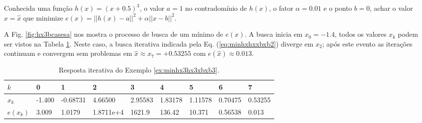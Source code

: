 \begin{example}\label{ex:minhx3hx3xbxb3}
Conhecida uma função $h(x)=(x+0.5)^3$, o valor $a=1$ no contradomínio de $h(x)$,
o fator $\alpha=0.01$ e o ponto $b=0$,
achar o valor $x=\hat{x}$ que minimize $e(x)=||h(x)-a||^2+\alpha||x-b||^2$.
\end{example}
\begin{SolutionT}\label{sol:minhx3hx3xbxb3}
 A Fig. \ref{fig:hx3bcasesa} nos mostra o processo de busca de um mínimo
 de $e(x)$. 
 A busca inicia em $x_0=-1.4$,
 todos os valores $x_{k}$ podem ser vistos na Tabela \ref{tab:hx3bcases3}. 
Neste caso, a busca iterativa indicada pela Eq. (\ref{eq:minhxhxxbxb2}) diverge
em $x_2$; após este evento as iterações continuam e convergem sem problemas 
em $\hat{x}\approx x_7=+0.53255$ com $e(\hat{x})\approx 0.013$.

\end{SolutionT}

\begin{table}[!h]
\centering
\begin{tabular}{|l|l|l|l|l|l|l|l|l|}
\hline
$k$      & 0 & 1 & 2 & 3 & 4 & 5 & 6 & 7 \\ \hline
$x_k$    & -1.400 & -0.68731 & 4.66500 & 2.95583 & 1.83178 & 1.11578 & 0.70475   & 0.53255 \\ \hline
$e(x_k)$ & 3.009 & 1.0179 & 1.8711e+4 & 1621.9 & 136.42 & 10.371 & 0.56538 & 0.013 \\ \hline
\end{tabular}
\caption{Resposta iterativa do Exemplo \ref{ex:minhx3hx3xbxb3}.}
\label{tab:hx3bcases3}
\end{table}

